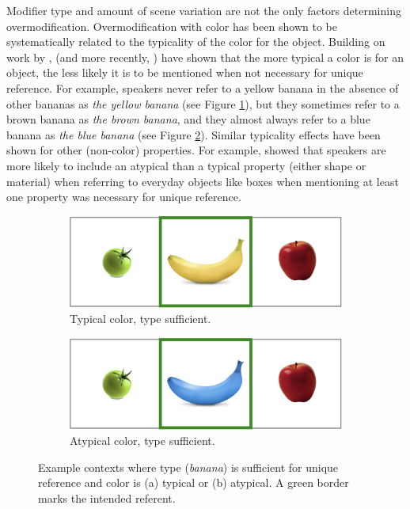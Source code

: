 \documentclass[11pt]{article}
\newcommand{\figref}[1]{Figure \ref{#1}}
\begin{document}
Modifier type and amount of scene variation are not the only factors determining overmodification. Overmodification with color has been shown to be systematically related to the typicality of the color for the object. Building on work by ,  (and more recently, ) have shown that the more typical a color is for an object, the less likely it is to be mentioned when not necessary for unique reference. For example, speakers never refer to a yellow banana in the absence of other bananas as \emph{the yellow banana} (see \figref{fig:typical}), but they sometimes refer to a brown banana as \emph{the brown banana}, and they almost always refer to a blue banana as \emph{the blue banana} (see \figref{fig:atypical}). Similar typicality effects have been shown for other (non-color) properties. For example,  showed that speakers are more likely to include an atypical than a typical property (either shape or material) when referring to everyday objects like boxes when mentioning at least one property was necessary for unique reference. %

\begin{figure}
\begin{subfigure}{.5\textwidth}
\includegraphics[width=\textwidth]{pics/banana-typical.png}
\caption{Typical color, type sufficient.}
\label{fig:typical}
\end{subfigure}
\begin{subfigure}{.5\textwidth}
\includegraphics[width=\textwidth]{pics/banana-atypical.png}
\caption{Atypical color, type sufficient.}
\label{fig:atypical}
\end{subfigure}
\caption{Example contexts where type (\emph{banana}) is sufficient for unique reference and color is (a) typical or (b) atypical. A green border marks the intended referent.}
\label{fig:pin}
\end{figure}
\end{document}
